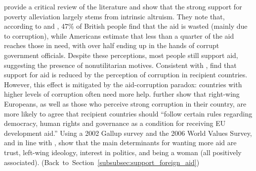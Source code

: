 \citet{hudson_mile_2012} provide a critical review of the literature and show that the strong support for poverty alleviation largely stems from intrinsic altruism. They note that, according to \citet{dfid_aid_2009} and \citet{pipa_americans_2001}, 47\% of British people find that the aid is wasted (mainly due to corruption), while Americans estimate that less than a quarter of the aid reaches those in need, with over half ending up in the hands of corrupt government officials. Despite these perceptions, most people still support aid, suggesting the presence of nonutilitarian motives. Consistent with \citet{henson_public_2010}, \citet{bauhr_does_2013} find that support for aid is reduced by the perception of corruption in recipient countries. However, this effect is mitigated by the aid-corruption paradox: countries with higher levels of corruption often need more help. %
\citet{bodenstein_who_2017} further show that right-wing Europeans, as well as those who perceive strong corruption in their country, are more likely to agree that recipient countries should ``follow certain rules regarding democracy, human rights and governance as a condition for receiving EU development aid.'' 
Using a 2002 Gallup survey and the 2006 World Values Survey, and in line with \citet{bayram_aiding_2017}, \citet{paxton_individual_2012} show that the main determinants for wanting more aid are trust, left-wing ideology, interest in politics, and being a woman (all positively associated).  \hfill (Back~to~Section~\ref{subsubsec:support_foreign_aid}) %


